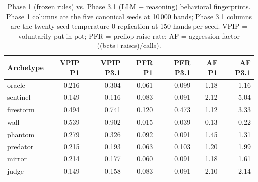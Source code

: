 \begin{table}[!ht]
\centering
\small
\begin{tabular}{lrrrrrr}
\hline
Archetype & VPIP P1 & VPIP P3.1 & PFR P1 & PFR P3.1 & AF P1 & AF P3.1 \\
\hline
oracle & 0.216 & 0.304 & 0.061 & 0.099 & 1.18 & 1.16 \\
sentinel & 0.149 & 0.116 & 0.083 & 0.091 & 2.12 & 5.04 \\
firestorm & 0.494 & 0.741 & 0.120 & 0.473 & 1.12 & 3.33 \\
wall & 0.539 & 0.902 & 0.015 & 0.039 & 0.13 & 0.22 \\
phantom & 0.279 & 0.326 & 0.092 & 0.091 & 1.45 & 1.31 \\
predator & 0.215 & 0.193 & 0.063 & 0.103 & 1.20 & 1.99 \\
mirror & 0.214 & 0.177 & 0.060 & 0.091 & 1.18 & 1.61 \\
judge & 0.149 & 0.158 & 0.083 & 0.091 & 2.10 & 2.14 \\
\hline
\end{tabular}
\caption{Phase 1 (frozen rules) vs. Phase 3.1 (LLM + reasoning) behavioral fingerprints. Phase 1 columns are the five canonical seeds at 10\,000 hands; Phase 3.1 columns are the twenty-seed temperature-0 replication at 150 hands per seed. VPIP = voluntarily put in pot; PFR = preflop raise rate; AF = aggression factor ((bets+raises)/calls).}
\label{tab:behavioral-shift}
\end{table}
